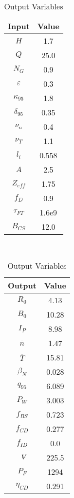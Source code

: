 \begin{table}[b!]
\centering
\caption{Charybdis Variables}
\hfill
\begin{subtable}[t]{0.4\textwidth}
\centering
\caption{Input Variables} ~\\
\begin{tabular}{ c|c }

Input            & Value           \\
\hline
$H$              & 1.7              \\
$Q$              & 25.0             \\
$N_{G}$          & 0.9              \\
$\varepsilon$       & 0.3              \\
$\kappa_{95}$    & 1.8              \\
$\delta_{95}$    & 0.35             \\
$\nu_{n}$        & 0.4              \\
$\nu_{T}$        & 1.1              \\
$l_{i}$          & 0.558         \\
$A$              & 2.5              \\
$Z_{eff}$        & 1.75             \\
$f_{D}$          & 0.9              \\
$\tau_{FT}$      & 1.6e9            \\
$B_{CS}$         & 12.0             \\

\end{tabular}
\end{subtable}
\hfill
\begin{subtable}[t]{0.5\textwidth}
\centering
\caption{Output Variables} ~\\
\begin{tabular}{ c|c }

Output           & Value       \\
\hline
$R_{0}$          & 4.13            \\
$B_{0}$          & 10.28            \\
$I_{P}$          & 8.98            \\
$\overline n$    & 1.47            \\
$\overline T$    & 15.81           \\
$\beta_{N}$       & 0.028            \\
$q_{95}$         & 6.089            \\
$P_{W}$          & 3.003            \\
$f_{BS}$         & 0.723           \\
$f_{CD}$         & 0.277           \\
$f_{ID}$         & 0.0              \\
$\volume$         & 225.5            \\
$P_{F}$          & 1294           \\
$\eta_{CD}$      & 0.291           \\


\end{tabular}
\end{subtable}
\end{table}
